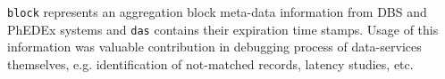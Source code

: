 \documentclass[1p,times]{elsarticle}
\begin{document}
\verb+block+ represents an aggregation block meta-data information from DBS
and PhEDEx systems and \verb+das+ contains their expiration time stamps.
Usage of this information was valuable contribution in debugging process of
data-services themselves, e.g. identification of not-matched records, 
latency studies, etc.

\end{document}
